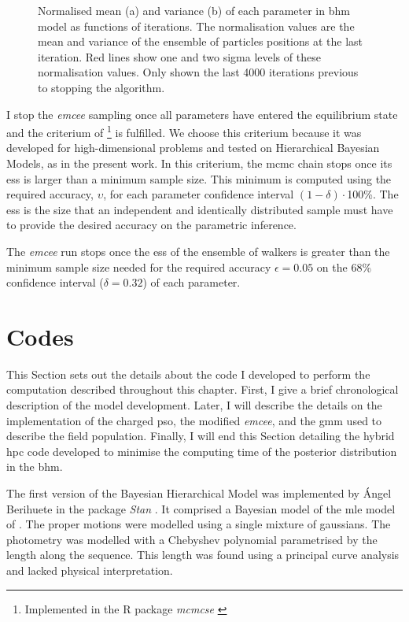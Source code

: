 \begin{figure}[H]
\begin{subfigure}[t]{0.45\textwidth}
        \caption{}
    \end{subfigure}
\caption{Normalised mean (a) and variance (b) of each parameter in \gls{bhm} model as functions of iterations. The normalisation values are the mean and variance of the ensemble of particles positions at the last iteration. Red lines show one and two sigma levels of these normalisation values. Only shown the last 4000 iterations previous to stopping the algorithm.}
\label{fig:convergence}
\end{figure}


I stop the \emph{emcee} sampling once all parameters have entered the equilibrium state and the criterium of \citet{Gong2016} \footnote{Implemented in the R package \emph{mcmcse} \citep{mcmcse}} is fulfilled. We choose this criterium because it was developed for high-dimensional problems and tested on Hierarchical Bayesian Models, as in the present work. In this criterium, the \gls{mcmc} chain stops once its \gls{ess} is larger than a minimum sample size. This minimum is computed using the required accuracy, $\upsilon$, for each parameter confidence interval $(1-\delta)\cdot$100\%. The \gls{ess} is the size that an independent and identically distributed sample must have to provide the desired accuracy on the parametric inference. 

The \emph{emcee} run stops once the \gls{ess} of the ensemble of walkers is greater than the minimum sample size needed for the required accuracy $\epsilon = 0.05$ on the 68\% confidence interval ($\delta = 0.32$) of each parameter.


\section{Codes}
\label{sect:code}
This Section sets out the details about the code I developed to perform the computation described throughout this chapter. First, I give a brief chronological description of the model development. Later, I will describe the details on the implementation of the charged \gls{pso}, the modified \emph{emcee}, and the \gls{gmm} used to describe the field population. Finally, I will end this Section detailing the hybrid \gls{hpc} code developed to minimise the computing time of the posterior distribution in the \gls{bhm}.

The first version of the Bayesian Hierarchical Model was implemented by \'Angel Berihuete in the package \emph{Stan} \citep{Stan}. It comprised a Bayesian model of the \gls{mle} model of \citet{Sarro2014}. The proper motions were modelled using a single mixture of gaussians. The photometry was modelled with a Chebyshev polynomial parametrised by the length along the sequence. This length was found using a principal curve analysis and lacked physical interpretation.

